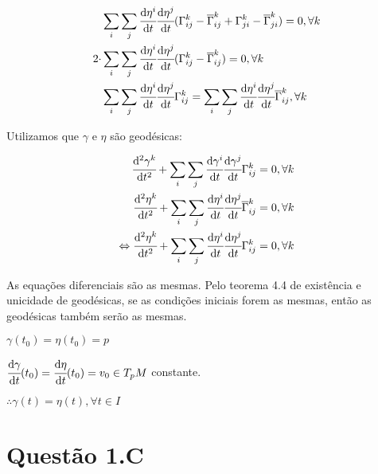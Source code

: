 \documentclass[10pt,a4paper]{article}
\begin{document}
		\begin{align*}
		  &\sum_i \sum_j \cfrac{\mathrm{d} \eta^i}{\mathrm{d} t} \cfrac{\mathrm{d} \eta^j}{\mathrm{d} t} ( \Gamma_{ij}^k - \overline{\Gamma}_{ij}^k + \Gamma_{ji}^k - \overline{\Gamma}_{ji}^k ) = 0, \forall k \\
		  2 \cdot &\sum_i \sum_j \cfrac{\mathrm{d} \eta^i}{\mathrm{d} t} \cfrac{\mathrm{d} \eta^j}{\mathrm{d} t} ( \Gamma_{ij}^k - \overline{\Gamma}_{ij}^k ) = 0, \forall k \\
		  &\sum_i \sum_j \cfrac{\mathrm{d} \eta^i}{\mathrm{d} t} \cfrac{\mathrm{d} \eta^j}{\mathrm{d} t} \Gamma_{ij}^k = \sum_i \sum_j \cfrac{\mathrm{d} \eta^i}{\mathrm{d} t} \cfrac{\mathrm{d} \eta^j}{\mathrm{d} t} \overline{\Gamma}_{ij}^k, \forall k
		\end{align*}

		Utilizamos que $\gamma$ e $\eta$ s\~ao geod\'esicas:

		\begin{align*}
		  \cfrac{\mathrm{d}^2 \gamma^k}{\mathrm{d} t^2} + \sum_i \sum_j \cfrac{\mathrm{d} \gamma^i}{\mathrm{d} t} \cfrac{\mathrm{d} \gamma^j}{\mathrm{d} t} \Gamma_{ij}^k &= 0, \forall k \\
		  \cfrac{\mathrm{d}^2 \eta^k}{\mathrm{d} t^2} + \sum_i \sum_j \cfrac{\mathrm{d} \eta^i}{\mathrm{d} t} \cfrac{\mathrm{d} \eta^j}{\mathrm{d} t} \overline{\Gamma}_{ij}^k &= 0, \forall k \\
		  \Leftrightarrow \cfrac{\mathrm{d}^2 \eta^k}{\mathrm{d} t^2} + \sum_i \sum_j \cfrac{\mathrm{d} \eta^i}{\mathrm{d} t} \cfrac{\mathrm{d} \eta^j}{\mathrm{d} t} \Gamma_{ij}^k &= 0, \forall k
		\end{align*}

		As equa\c{c}\~oes diferenciais s\~ao as mesmas. Pelo teorema 4.4 de exist\^encia e unicidade de geod\'esicas, se as condi\c{c}\~oes iniciais forem as mesmas, ent\~ao as geod\'esicas tamb\'em ser\~ao as mesmas.

		$\gamma(t_0) = \eta(t_0) = p$

		$\cfrac{\mathrm{d} \gamma}{\mathrm{d} t}(t_0) = \cfrac{\mathrm{d} \eta}{\mathrm{d} t}(t_0) = v_0 \in T_pM$ constante.

		$\therefore \gamma(t) = \eta(t), \forall t \in I$

		\vspace{600mm}

	\section{Quest\~ao 1.C}
		\begin{flushright}
		\end{flushright}
\end{document}
